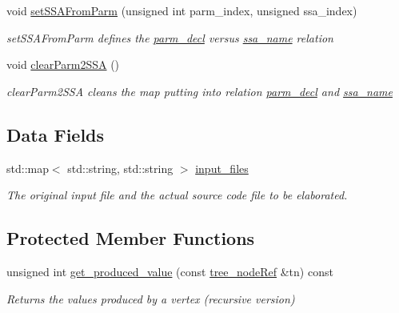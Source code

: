 \begin{DoxyCompactItemize}
void \hyperlink{classapplication__manager_a7b00a19f52bd23b5d4e35b93b46a3637}{set\+S\+S\+A\+From\+Parm} (unsigned int parm\+\_\+index, unsigned ssa\+\_\+index)
\begin{DoxyCompactList}\small\item\em set\+S\+S\+A\+From\+Parm defines the \hyperlink{structparm__decl}{parm\+\_\+decl} versus \hyperlink{structssa__name}{ssa\+\_\+name} relation \end{DoxyCompactList}\item 
void \hyperlink{classapplication__manager_ad03a2ed8cf0cdfabcbc8cb903c4d12f1}{clear\+Parm2\+S\+SA} ()
\begin{DoxyCompactList}\small\item\em clear\+Parm2\+S\+SA cleans the map putting into relation \hyperlink{structparm__decl}{parm\+\_\+decl} and \hyperlink{structssa__name}{ssa\+\_\+name} \end{DoxyCompactList}\end{DoxyCompactItemize}
\subsection*{Data Fields}
\begin{DoxyCompactItemize}
\item 
std\+::map$<$ std\+::string, std\+::string $>$ \hyperlink{classapplication__manager_a8ddc0adc950ac9298402b66eadede94f}{input\+\_\+files}
\begin{DoxyCompactList}\small\item\em The original input file and the actual source code file to be elaborated. \end{DoxyCompactList}\end{DoxyCompactItemize}
\subsection*{Protected Member Functions}
\begin{DoxyCompactItemize}
\item 
unsigned int \hyperlink{classapplication__manager_a045c72426358aa0594dce15ac2138d7a}{get\+\_\+produced\+\_\+value} (const \hyperlink{tree__node_8hpp_a6ee377554d1c4871ad66a337eaa67fd5}{tree\+\_\+node\+Ref} \&tn) const
\begin{DoxyCompactList}\small\item\em Returns the values produced by a vertex (recursive version) \end{DoxyCompactList}\end{DoxyCompactItemize}
